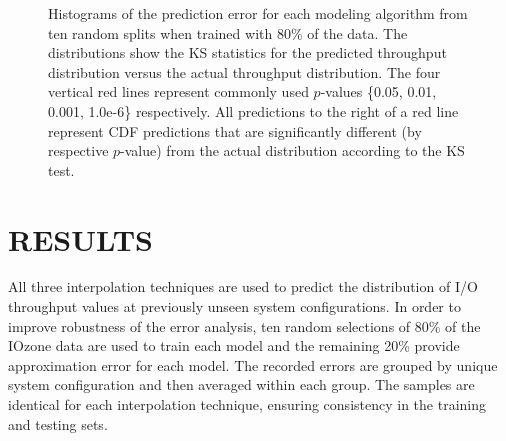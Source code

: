 \documentclass[letterpaper, 10 pt, conference]{ieeeconf}  %
\begin{document}
\begin{figure}
  \caption{Histograms of the prediction error for each modeling algorithm from ten random splits when trained with 80\% of the data. The distributions show the KS statistics for the predicted throughput distribution versus the actual throughput distribution. The four vertical red lines represent commonly used $p$-values \{0.05, 0.01, 0.001, 1.0e-6\} respectively. All predictions to the right of a red line represent CDF predictions that are significantly different (by respective $p$-value) from the actual distribution according to the KS test.
  \vspace{-.1cm}}
  \label{fig:ks_histogram_80_20}
\end{figure}

\section{RESULTS}
\label{sec:results}

All three interpolation techniques are used to predict the distribution of I/O throughput values at previously unseen system configurations. In order to improve robustness of the error analysis, ten random selections of 80\% of the IOzone data are used to train each model and the remaining 20\% provide approximation error for each model. The recorded errors are grouped by unique system configuration and then averaged within each group. The samples are identical for each interpolation technique, ensuring consistency in the training and testing sets.
\end{document}
